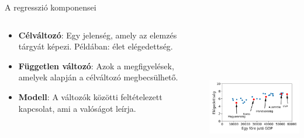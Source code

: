 \documentclass[english, aspectratio=169]{beamer}
\begin{document}
\begin{frame}{A regresszió komponensei}
\begin{columns}
\begin{column}{.5\textwidth}
\begin{itemize}
	\item \textbf{Célváltozó}: Egy jelenség, amely az elemzés tárgyát képezi. Példában: élet elégedettség. 
	\item \textbf{Független változó}: Azok a megfigyelések, amelyek alapján a célváltozó megbecsülhető. 
	\item \textbf{Modell}: A változók közötti feltételezett kapcsolat, ami a valóságot leírja.
\end{itemize}
\end{column}
\begin{column}{.5\textwidth}
\begin{center}
\includegraphics[width=7cm, height=7cm, keepaspectratio]{images/regresszio_4.png}
\end{center}
\end{column}
\end{columns}
\end{frame}
\end{document}
